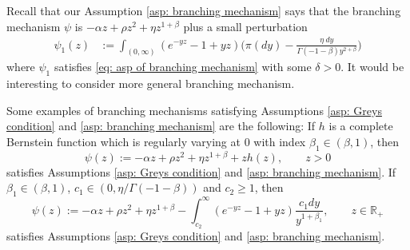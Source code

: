 \documentclass[12pt,a4paper]{amsart}
\theoremstyle{plain}
\theoremstyle{definition}
\numberwithin{equation}{section}
\begin{document}
    Recall that our Assumption \ref{asp: branching mechanism} says that the branching mechanism $\psi$ is $-\alpha z + \rho z^2+\eta z^{1+\beta}$ plus a small perturbation 
\begin{align}
\label{eq: psi 1}
	\psi_1(z)
	&:= \int_{(0,\infty)}(e^{-yz}-1+yz) \Big(\pi(dy) - \frac{\eta~dy}{\Gamma(-1-\beta)y^{2+\beta}}\Big)
\end{align}
    where $\psi_1$ satisfies \eqref{eq: asp of branching mechanism} with some $\delta>0$.
    It would be interesting to consider more general branching mechanism.


    Some examples of branching mechanisms satisfying Assumptions \ref{asp: Greys condition} and \ref{asp: branching mechanism} are the following:
    If $h$ is a complete Bernstein function which is regularly varying at 0 with index
$\beta_1\in (\beta, 1)$, then 
$$
    \psi(z):=-\alpha z + \rho z^2+\eta z^{1+\beta}+zh(z), \qquad z>0
$$
satisfies Assumptions \ref{asp: Greys condition} and \ref{asp: branching mechanism}.
If $\beta_1\in (\beta, 1)$, $c_1\in (0, \eta/\Gamma(-1-\beta))$ and $c_2\ge 1$, then
$$
\psi(z):=-\alpha z + \rho z^2+\eta z^{1+\beta}-\int^\infty_{c_2}
(e^{-yz}-1+yz)\frac{c_1dy}{y^{1+\beta_1}}, \qquad z\in \mathbb R_+
$$
satisfies Assumptions \ref{asp: Greys condition} and \ref{asp: branching mechanism}.
\end{document}
